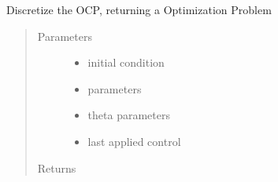 \documentclass[letterpaper,10pt,english]{sphinxmanual}
\begin{document}
\begin{fulllineitems}
\begin{fulllineitems}
\label{\detokenize{yaocptool.methods.base:yaocptool.methods.base.discretizationschemebase.DiscretizationSchemeBase.discretize}}
Discretize the OCP, returning a Optimization Problem
\begin{quote}\begin{description}
\item[{Parameters}] \leavevmode\begin{itemize}
\item {} 
 \textendash{} initial condition

\item {} 
 \textendash{} parameters

\item {} 
 \textendash{} theta parameters

\item {} 
 \textendash{} last applied control

\end{itemize}

\item[{Returns}] \leavevmode


\end{description}\end{quote}

\end{fulllineitems}


\begin{fulllineitems}
\label{\detokenize{yaocptool.methods.base:yaocptool.methods.base.discretizationschemebase.DiscretizationSchemeBase.finite_elements}}
\end{fulllineitems}


\begin{fulllineitems}
\label{\detokenize{yaocptool.methods.base:yaocptool.methods.base.discretizationschemebase.DiscretizationSchemeBase.get_system_at_given_times}}
\end{fulllineitems}


\end{fulllineitems}
\end{document}
